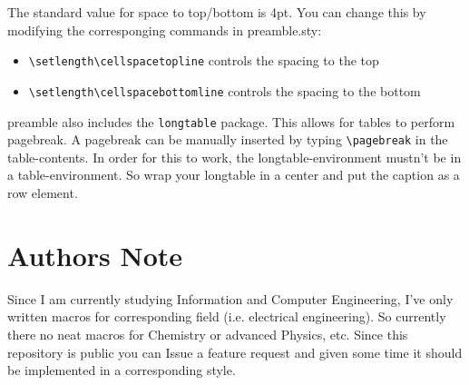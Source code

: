 \documentclass{report}
\begin{document}
    The standard value for space to top/bottom is 4pt. You can change this by modifying the corresponging commands
    in preamble.sty:
    \begin{itemize}
      \item \lstinline|\setlength\cellspacetopline|  controls the spacing to the top
      \item \lstinline|\setlength\cellspacebottomline| controls the spacing to the bottom
    \end{itemize}

    preamble also includes the \lstinline|longtable| package. This allows for tables to perform pagebreak. A
    pagebreak can be manually inserted by typing \lstinline|\pagebreak| in the table-contents. In order for
    this to work, the longtable-environment mustn't be in a table-environment. So wrap your longtable in
    a center and put the caption as a row element.

  \section{Authors Note}
    Since I am currently studying Information and Computer Engineering, I've only written macros for 
    corresponding field (i.e. electrical engineering). So currently there no neat macros for Chemistry or
    advanced Physics, etc. Since this repository is public you can Issue a feature request and given some 
    time it should be implemented in a corresponding style.
\end{document}

